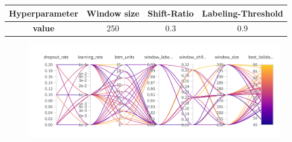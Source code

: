 \documentclass[landscape,a3,final,24pt]{issposter}
\begin{document}
\begin{multicols}{3}
\begin{center}
\begin{tabular}{cccc}
   \toprule
   \textbf{Hyperparameter}  & Window size &Shift-Ratio&  Labeling-Threshold \\
   \midrule
   \textbf{value}&250 &0.3&0.9 \\
   \bottomrule
\end{tabular}
\begin{figure}
\centering
\includegraphics[width=\linewidth,keepaspectratio]{Pictures/wandb_sweep.png}
\end{figure}
\end{center}


\end{multicols}
\end{document}
